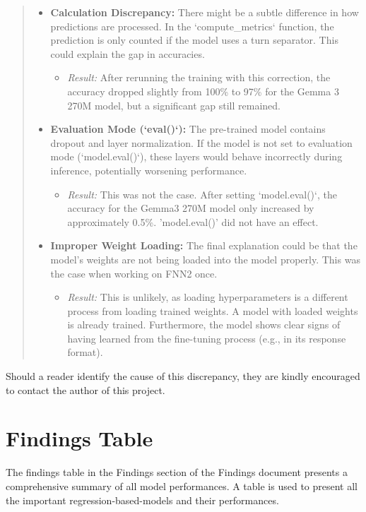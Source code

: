 \documentclass{article}
\begin{document}
\begin{quote}
{\begin{itemize}
    \item \textbf{Calculation Discrepancy:} There might be a subtle difference in how predictions are processed. In the `compute\_metrics` function, the prediction is only counted if the model uses a turn separator. This could explain the gap in accuracies.
        \begin{itemize}
            \item \textit{Result:} After rerunning the training with this correction, the accuracy dropped slightly from 100\% to 97\% for the Gemma 3 270M model, but a significant gap still remained.
        \end{itemize}

    \item \textbf{Evaluation Mode (`eval()`):} The pre-trained model contains dropout and layer normalization. If the model is not set to evaluation mode (`model.eval()`), these layers would behave incorrectly during inference, potentially worsening performance.
        \begin{itemize}
            \item \textit{Result:} This was not the case. After setting `model.eval()`, the accuracy for the Gemma3 270M model only increased by approximately 0.5\%. 'model.eval()' did not have an effect.
        \end{itemize}

    \item \textbf{Improper Weight Loading:} The final explanation could be that the model's weights are not being loaded into the model properly. This was the case when working on FNN2 once.
        \begin{itemize}
            \item \textit{Result:} This is unlikely, as loading hyperparameters is a different process from loading trained weights. A model with loaded weights is already trained. Furthermore, the model shows clear signs of having learned from the fine-tuning process (e.g., in its response format).
        \end{itemize}
\end{itemize}
}
\end{quote}
Should a reader identify the cause of this discrepancy, they are kindly encouraged to contact the author of this project.

\section{Findings Table}
The findings table in the Findings section of the Findings document presents a comprehensive summary of all model performances. A table is used to present all the important regression-based-models and their performances.
\end{document}
